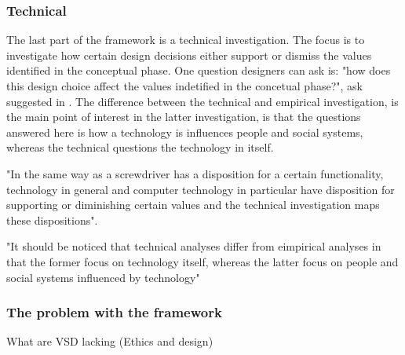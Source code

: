 \subsubsection{Technical}
The last  part of the framework is a technical investigation. The focus is to investigate how certain design decisions either support or dismiss the values identified in the conceptual phase. One question designers can ask is: "how does this design choice affect the values indetified in the concetual phase?", ask suggested in . The difference between the technical and empirical investigation, is the main point of interest in the latter investigation, is that the questions answered here is how a technology is influences people and social systems, whereas the technical questions the technology in itself.   

"In the same way as a screwdriver has a disposition for a certain functionality, technology in general and computer technology in particular have disposition for supporting or diminishing certain values and the technical investigation maps these dispositions". 

"It should be noticed that technical analyses differ from eimpirical analyses in that the former focus on technology itself, whereas the latter focus on people and social systems influenced by technology"


\subsubsection{The problem with the framework}
What are VSD lacking (Ethics and design)
